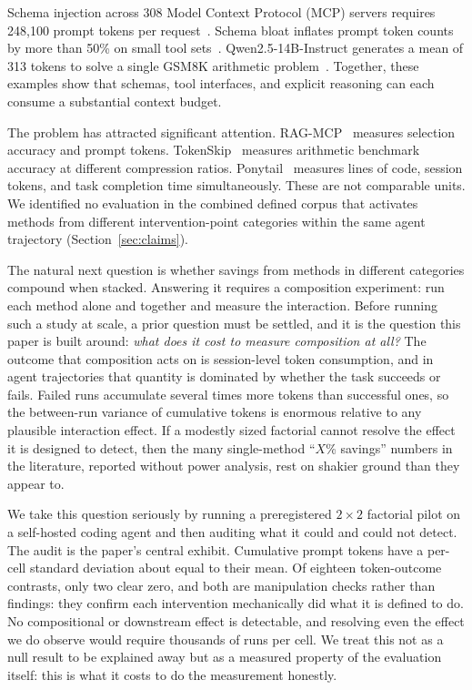 \documentclass{article}
\begin{document}
Schema injection across 308 Model Context Protocol (MCP) servers requires 248{,}100 prompt tokens per request~\citep{mcpzero2025}. Schema bloat inflates prompt token counts by more than 50\% on small tool sets~\citep{ragmcp2025}. Qwen2.5-14B-Instruct generates a mean of 313 tokens to solve a single GSM8K arithmetic problem~\citep{tokenskip2025}. Together, these examples show that schemas, tool interfaces, and explicit reasoning can each consume a substantial context budget.

The problem has attracted significant attention. RAG-MCP~\citep{ragmcp2025} measures selection accuracy and prompt tokens. TokenSkip~\citep{tokenskip2025} measures arithmetic benchmark accuracy at different compression ratios. Ponytail~\citep{ponytail2025} measures lines of code, session tokens, and task completion time simultaneously. These are not comparable units. We identified no evaluation in the combined defined corpus that activates methods from different intervention-point categories within the same agent trajectory (Section~\ref{sec:claims}).

The natural next question is whether savings from methods in different categories compound when stacked. Answering it requires a composition experiment: run each method alone and together and measure the interaction. Before running such a study at scale, a prior question must be settled, and it is the question this paper is built around: \emph{what does it cost to measure composition at all?} The outcome that composition acts on is session-level token consumption, and in agent trajectories that quantity is dominated by whether the task succeeds or fails. Failed runs accumulate several times more tokens than successful ones, so the between-run variance of cumulative tokens is enormous relative to any plausible interaction effect. If a modestly sized factorial cannot resolve the effect it is designed to detect, then the many single-method ``$X$\% savings'' numbers in the literature, reported without power analysis, rest on shakier ground than they appear to.

We take this question seriously by running a preregistered $2{\times}2$ factorial pilot on a self-hosted coding agent and then auditing what it could and could not detect. The audit is the paper's central exhibit. Cumulative prompt tokens have a per-cell standard deviation about equal to their mean. Of eighteen token-outcome contrasts, only two clear zero, and both are manipulation checks rather than findings: they confirm each intervention mechanically did what it is defined to do. No compositional or downstream effect is detectable, and resolving even the effect we do observe would require thousands of runs per cell. We treat this not as a null result to be explained away but as a measured property of the evaluation itself: this is what it costs to do the measurement honestly.
\end{document}

